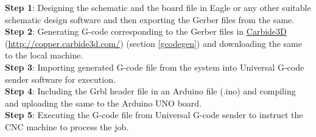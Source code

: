 \hspace{-13.7mm}
\textbf{Step 1}: Designing the schematic and the board file in Eagle or any other suitable schematic design software and then exporting the Gerber files from the same. \\[5mm]
\textbf{Step 2}: Generating G-code corresponding to the Gerber files in \href{http://copper.carbide3d.com/}{Carbide3D} (\url{http://copper.carbide3d.com/}) (section \ref{gcodegen}) and downloading the same to the local machine. \\[5mm]
\textbf{Step 3}: Importing generated G-code file from the system into Universal G-code sender software for execution. \\[5mm]
\textbf{Step 4}: Including the Grbl header file in an Arduino file (.ino) and compiling and uploading the same to the Arduino UNO board. \\[5mm]
\textbf{Step 5}: Executing the G-code file from Universal G-code sender to instruct the CNC machine to process the job.
